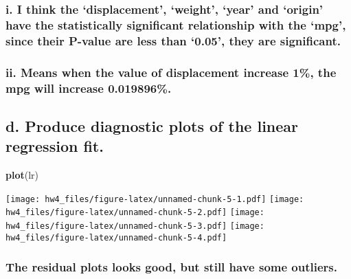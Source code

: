 \documentclass[]{article}
\newenvironment{Shaded}{\begin{snugshade}}{\end{snugshade}}
\newcommand{\KeywordTok}[1]{\textcolor[rgb]{0.13,0.29,0.53}{\textbf{#1}}}
\newcommand{\NormalTok}[1]{#1}
\begin{document}
\hypertarget{i.-i-think-the-displacement-weight-year-and-origin-have-the-statistically-significant-relationship-with-the-mpg-since-their-p-value-are-less-than-0.05-they-are-significant.}{%
\subsubsection{i. I think the `displacement', `weight', `year' and
`origin' have the statistically significant relationship with the `mpg',
since their P-value are less than `0.05', they are
significant.}\label{i.-i-think-the-displacement-weight-year-and-origin-have-the-statistically-significant-relationship-with-the-mpg-since-their-p-value-are-less-than-0.05-they-are-significant.}}

\hypertarget{ii.-means-when-the-value-of-displacement-increase-1-the-mpg-will-increase-0.019896.}{%
\subsubsection{ii. Means when the value of displacement increase 1\%,
the mpg will increase
0.019896\%.}\label{ii.-means-when-the-value-of-displacement-increase-1-the-mpg-will-increase-0.019896.}}

\hypertarget{d.-produce-diagnostic-plots-of-the-linear-regression-fit.}{%
\subsection{d. Produce diagnostic plots of the linear regression
fit.}\label{d.-produce-diagnostic-plots-of-the-linear-regression-fit.}}

\begin{Shaded}
\begin{Highlighting}[]
\KeywordTok{plot}\NormalTok{(lr)}
\end{Highlighting}
\end{Shaded}

\texttt{[image: hw4\_files/figure-latex/unnamed-chunk-5-1.pdf]}
\texttt{[image: hw4\_files/figure-latex/unnamed-chunk-5-2.pdf]}
\texttt{[image: hw4\_files/figure-latex/unnamed-chunk-5-3.pdf]}
\texttt{[image: hw4\_files/figure-latex/unnamed-chunk-5-4.pdf]}

\hypertarget{the-residual-plots-looks-good-but-still-have-some-outliers.}{%
\subsubsection{The residual plots looks good, but still have some
outliers.}\label{the-residual-plots-looks-good-but-still-have-some-outliers.}}
\end{document}
